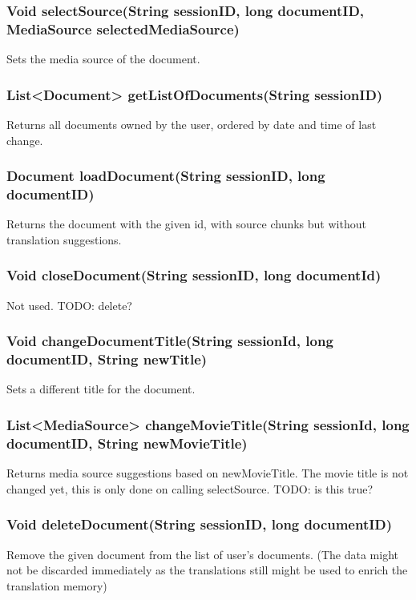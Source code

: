 \subsubsection{Void selectSource(String sessionID, long documentID, MediaSource selectedMediaSource)}
Sets the media source of the document.

\subsubsection{List<Document> getListOfDocuments(String sessionID)}
Returns all documents owned by the user, ordered by date and time of last change.

\subsubsection{Document loadDocument(String sessionID, long documentID)}
Returns the document with the given id, with source chunks but without translation suggestions.

\subsubsection{Void closeDocument(String sessionID, long documentId)}
Not used. TODO: delete?
     	
\subsubsection{Void changeDocumentTitle(String sessionId, long documentID, String newTitle)}
Sets a different title for the document.
     	
\subsubsection{List<MediaSource> changeMovieTitle(String sessionId, long documentID, String newMovieTitle)}
Returns media source suggestions based on newMovieTitle.
The movie title is not changed yet,
this is only done on calling selectSource.
TODO: is this true?     	 
     	
\subsubsection{Void deleteDocument(String sessionID, long documentID)}
Remove the given document from the list of user's documents.
(The data might not be discarded immediately
as the translations still might be used to enrich the translation memory)	 

